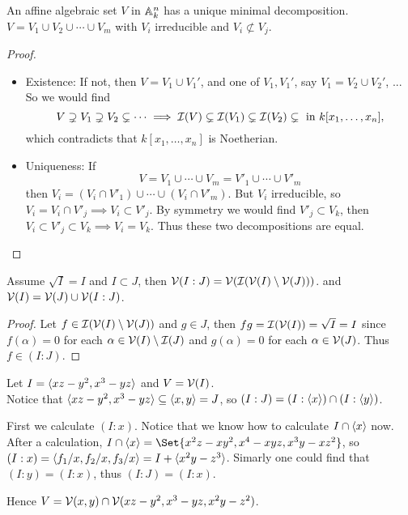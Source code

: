 \begin{prop}
  An affine algebraic set $V$ in $\mathbb{A}^n_k$ has a unique minimal decomposition.
  $V = V_1 \cup V_2 \cup \dotsm \cup V_m$ with $V_i$ irreducible and
  $V_i \not\subset V_j$.
  \begin{proof}
    \begin{itemize} \hfill
        \item Existence: If not, then $V = V_1 \cup V_1'$,
          and one of $V_1, V_1'$, say $V_1 = V_2 \cup V_2'$, ...
          So we would find
          \[ V \supsetneq V_1 \supsetneq V_2 \subsetneq \dotsm
            \implies \mathcal{I}(V) \subsetneq \mathcal{I}(V_1) \subsetneq \mathcal{I}(V_2) \subsetneq
            \text{ in } k[x_1, \dots, x_n], \]
          which contradicts that $k[x_1, \dots, x_n]$ is Noetherian.
        \item Uniqueness: If
          \[ V = V_1 \cup \dotsm \cup V_m = V'_1 \cup \dotsm \cup V'_m \]
          then $V_i = (V_i \cap V'_1) \cup \dotsm \cup (V_i \cap V'_m)$.
          But $V_i$ irreducible, so $V_i = V_i \cap V'_j \implies V_i \subset V'_j$.
          By symmetry we would find $V'_j \subset V_k$, then
          $V_i \subset V'_j \subset V_k \implies V_i = V_k$.
          Thus these two decompositions are equal.
    \end{itemize}
  \end{proof}
\end{prop}

\begin{theorem}[Decomposition]
  Assume $\sqrt{I} = I$ and $I \subset J$, then $\mathcal{V}(I : J) = \mathcal{V}(\mathcal{I}(\mathcal{V}(I) \setminus \mathcal{V}(J)))$.
  and $\mathcal{V}(I) = \mathcal{V}(J) \cup \mathcal{V}(I: J)$.
  \begin{proof}
    Let $f \in \mathcal{I}(\mathcal{V}(I) \setminus \mathcal{V}(J))$ and $g \in J$,
    then $fg = \mathcal{I}(\mathcal{V}(I)) = \sqrt{I} = I$ since $f(\alpha) = 0$
    for each $\alpha \in \mathcal{V}(I) \setminus \mathcal{I}(J)$ and $g(\alpha) = 0$
    for each $\alpha \in \mathcal{V}(J)$. Thus $f \in (I: J)$.
  \end{proof}
\end{theorem}

\begin{example}
  Let $I = \langle xz - y^2, x^3 - yz \rangle$ and $V = \mathcal{V}(I)$. \\

  Notice that $\langle xz - y^2 , x^3 - yz \rangle \subseteq \langle x, y \rangle = J$,
  so $(I: J) = (I: \langle x \rangle) \cap (I: \langle y\rangle)$.

  First we calculate $(I: x)$. Notice that we know how to calculate $I \cap \langle x\rangle$ now.
  After a calculation, $I \cap \gen{x} = \Set{x^2z - xy^2, x^4 - xyz, x^3y - xz^2}$,
  so $(I: x) = \langle f_1/x, f_2/x, f_3/x\rangle = I + \langle x^2y - z^3\rangle$.
  Simarly one could find that $(I: y) = (I: x)$, thus $(I: J) = (I: x)$.

  Hence $V = \mathcal{V}(x, y) \cap \mathcal{V}(xz-y^2, x^3-yz, x^2y - z^2)$.
\end{example}

